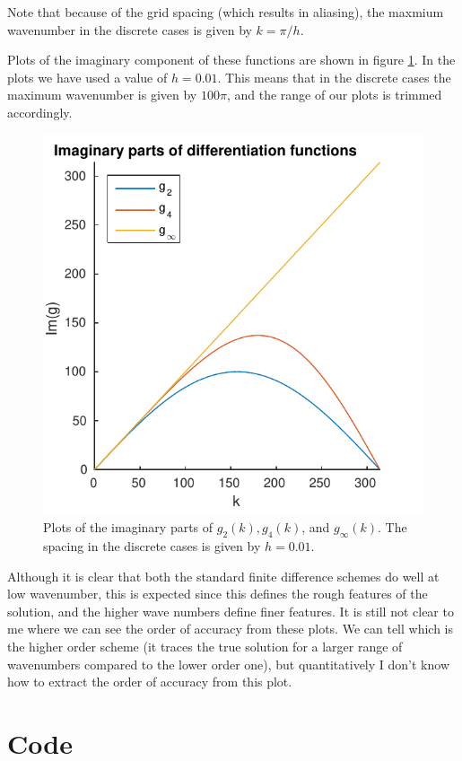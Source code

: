 \documentclass{article}
\begin{document}
Note that because of the grid spacing (which results in aliasing), the maxmium wavenumber in the discrete cases is given by $k = \pi / h$.

Plots of the imaginary component of these functions are shown in figure \ref{fig:p1}.
In the plots we have used a value of $h = 0.01$.
This means that in the discrete cases the maximum wavenumber is given by $100\pi$, and the range of our plots is trimmed accordingly.

\begin{figure}
\centering
\includegraphics[scale=1.0]{p1.pdf}
\caption{Plots of the imaginary parts of $g_2(k), g_4(k)$, and $g_\infty(k)$. The spacing in the discrete cases is given by $h = 0.01$.}
\label{fig:p1}
\end{figure}

Although it is clear that both the standard finite difference schemes do well at low wavenumber, this is expected since this defines the rough features of the solution, and the higher wave numbers define finer features.
It is still not clear to me where we can see the order of accuracy from these plots.
We can tell which is the higher order scheme (it traces the true solution for a larger range of wavenumbers compared to the lower order one), but quantitatively I don't know how to extract the order of accuracy from this plot.

\clearpage
\appendix
\section{Code}

\end{document}
